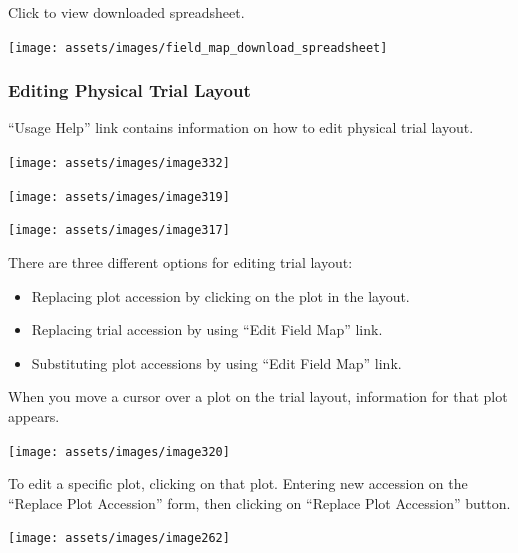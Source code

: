 \documentclass[
  12pt,
]{book}
\begin{document}
Click to view downloaded spreadsheet.

\begin{center}\texttt{[image: assets/images/field\_map\_download\_spreadsheet]} \end{center}

\hypertarget{editing-physical-trial-layout}{%
\subsubsection*{Editing Physical Trial Layout}\label{editing-physical-trial-layout}}


``Usage Help'' link contains information on how to edit physical trial layout.

\begin{center}\texttt{[image: assets/images/image332]} \end{center}

\begin{center}\texttt{[image: assets/images/image319]} \end{center}

\begin{center}\texttt{[image: assets/images/image317]} \end{center}

There are three different options for editing trial layout:

\begin{itemize}
\item
  Replacing plot accession by clicking on the plot in the layout.
\item
  Replacing trial accession by using ``Edit Field Map'' link.
\item
  Substituting plot accessions by using ``Edit Field Map'' link.
\end{itemize}

When you move a cursor over a plot on the trial layout, information for that plot appears.

\begin{center}\texttt{[image: assets/images/image320]} \end{center}

To edit a specific plot, clicking on that plot. Entering new accession on the ``Replace Plot Accession'' form, then clicking on ``Replace Plot Accession'' button.

\begin{center}\texttt{[image: assets/images/image262]} \end{center}
\end{document}
